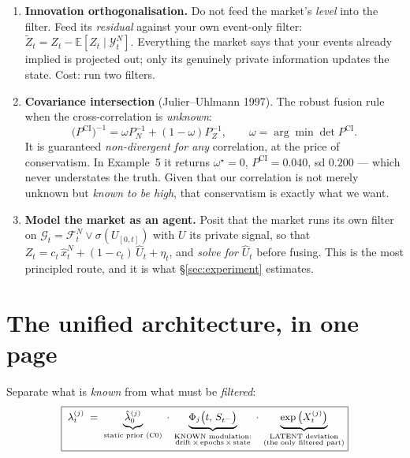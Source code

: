 \documentclass[11pt,a4paper]{article}
\theoremstyle{plain}
\begin{document}
\begin{enumerate}
\item \textbf{Innovation orthogonalisation.} Do not feed the market's \emph{level} into the
filter. Feed its \emph{residual} against your own event-only filter:
$\tilde Z_t = Z_t - \mathbb{E}[Z_t \mid \mathcal{Y}^N_t]$. Everything the market says that your
events already implied is projected out; only its genuinely private information updates the
state. Cost: run two filters.

\item \textbf{Covariance intersection} (Julier--Uhlmann 1997). The robust fusion rule when the
cross-correlation is \emph{unknown}:
\[
  \big(P^{\mathrm{CI}}\big)^{-1} = \omega P_N^{-1} + (1-\omega)P_Z^{-1},
  \qquad \omega = \arg\min \det P^{\mathrm{CI}}.
\]
It is guaranteed \emph{non-divergent for any} correlation, at the price of conservatism. In
Example~5 it returns $\omega^\star=0$, $P^{\mathrm{CI}} = 0.040$, sd $0.200$ --- which never
understates the truth. Given that our correlation is not merely unknown but \emph{known to be
high}, that conservatism is exactly what we want.

\item \textbf{Model the market as an agent.} Posit that the market runs its own filter on
$\mathcal{G}_t = \mathcal{F}^N_t \vee \sigma(U_{[0,t]})$ with $U$ its private signal, so that
$Z_t = c_t\,\hat x^N_t + (1-c_t)\,\hat U_t + \eta_t$, and \emph{solve for} $\hat U_t$ before
fusing. This is the most principled route, and it is what \S\ref{sec:experiment} estimates.
\end{enumerate}

\section{The unified architecture, in one page}

Separate what is \emph{known} from what must be \emph{filtered}:
\begin{equation}
\small
\boxed{\;
  \lambda^{(j)}_t \;=\;
  \underbrace{\hat\lambda^{(j)}_0}_{\text{static prior (C0)}}
  \;\cdot\;
  \underbrace{\Phi_j\big(t,\,S_{t^-}\big)}_{\substack{\text{KNOWN modulation:}\\
  \text{drift}\,\times\,\text{epochs}\,\times\,\text{state}}}
  \;\cdot\;
  \underbrace{\exp\big(X^{(j)}_t\big)}_{\substack{\text{LATENT deviation}\\ \text{(the only filtered part)}}}}
\label{eq:decomp}
\end{equation}
\end{document}
